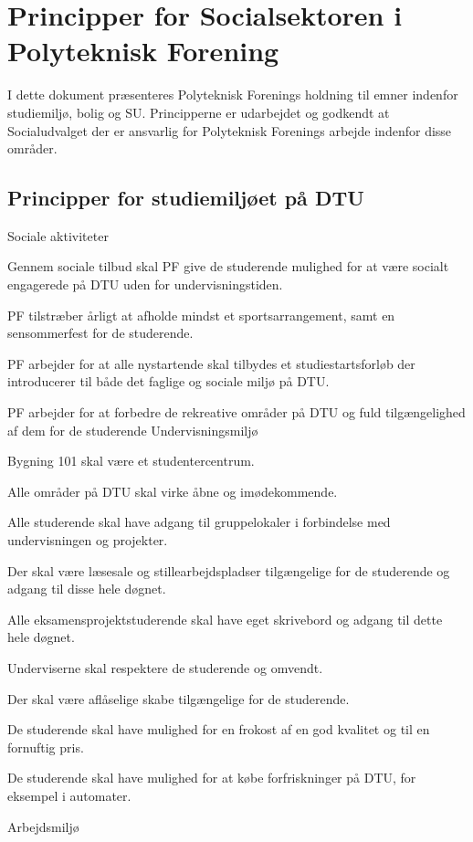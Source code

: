 \section{Principper for Socialsektoren i Polyteknisk Forening}
I dette dokument præsenteres Polyteknisk Forenings holdning til emner indenfor studiemiljø, bolig og SU. Principperne
er udarbejdet og godkendt at Socialudvalget der er ansvarlig for Polyteknisk Forenings arbejde indenfor disse områder.
\subsection{Principper for studiemiljøet på DTU}
Sociale aktiviteter
\begin{list}{•}
\item Gennem sociale tilbud skal PF give de studerende mulighed for at være socialt engagerede på DTU uden for
undervisningstiden.
\item PF tilstræber årligt at afholde mindst et sportsarrangement, samt en sensommerfest for de studerende.
\item PF arbejder for at alle nystartende skal tilbydes et studiestartsforløb der introducerer til både det faglige og
sociale miljø på DTU.
\item PF arbejder for at forbedre de rekreative områder på DTU og fuld tilgængelighed af dem for de studerende
Undervisningsmiljø
\item Bygning 101 skal være et studentercentrum.
\item Alle områder på DTU skal virke åbne og imødekommende.
\item Alle studerende skal have adgang til gruppelokaler i forbindelse med undervisningen og projekter.
\item  Der skal være læsesale og stillearbejdspladser tilgængelige for de studerende og adgang til disse hele døgnet.
\item Alle eksamensprojektstuderende skal have eget skrivebord og adgang til dette hele døgnet.
\item Underviserne skal respektere de studerende og omvendt.
\item Der skal være aflåselige skabe tilgængelige for de studerende.
\item De studerende skal have mulighed for en frokost af en god kvalitet og til en fornuftig pris.
\item De studerende skal have mulighed for at købe forfriskninger på DTU, for eksempel i automater.
\end{list}
Arbejdsmiljø
